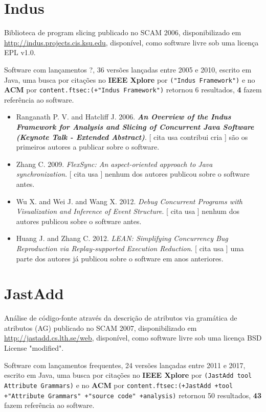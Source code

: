 \section{Indus}

Biblioteca de program slicing
publicado no SCAM 2006,
disponibilizado em \url{http://indus.projects.cis.ksu.edu},
disponível,
como software livre
sob uma licença EPL v1.0.

Software com lançamentos ?,
36 versões lançadas
entre 2005 e 2010,
escrito em Java,
uma busca por citações no {\bf IEEE Xplore} por
\texttt{("Indus Framework")}
e no {\bf ACM} por
\texttt{content.ftsec:(+"Indus Framework")}
retornou
6 resultados,
{\bf 4} fazem referência ao software.

\begin{itemize}
\item Ranganath P. V. and Hatcliff J.
      2006.
        \textbf{\textit{ An Overview of the Indus Framework for Analysis and Slicing of Concurrent Java Software (Keynote Talk - Extended Abstract)}}.
      [
          cita
          usa
          contribui
          cria
      ]
são os primeiros autores a publicar sobre o software.
\item Zhang C.
      2009.
        \textit{ FlexSync: An aspect-oriented approach to Java synchronization}.
      [
          cita
          usa
      ]
nenhum dos autores publicou sobre o software antes.
\item Wu X. and Wei J. and Wang X.
      2012.
        \textit{ Debug Concurrent Programs with Visualization and Inference of Event Structure}.
      [
          cita
          usa
      ]
nenhum dos autores publicou sobre o software antes.
\item Huang J. and Zhang C.
      2012.
        \textit{ LEAN: Simplifying Concurrency Bug Reproduction via Replay-supported Execution Reduction}.
      [
          cita
          usa
      ]
uma parte dos autores já publicou sobre o software em anos anteriores.
\end{itemize}
\section{JastAdd}

Análise de código-fonte através da descrição de atributos via gramática de atributos (AG)
publicado no SCAM 2007,
disponibilizado em \url{http://jastadd.cs.lth.se/web},
disponível,
como software livre
sob uma licença BSD License "modified".

Software com lançamentos frequentes,
24 versões lançadas
entre 2011 e 2017,
escrito em Java,
uma busca por citações no {\bf IEEE Xplore} por
\texttt{(JastAdd tool Attribute Grammars)}
e no {\bf ACM} por
\texttt{content.ftsec:(+JastAdd +tool +"Attribute Grammars" +"source code" +analysis)}
retornou
50 resultados,
{\bf 43} fazem referência ao software.

